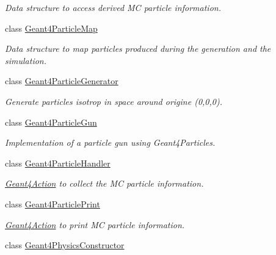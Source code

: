 \begin{DoxyCompactItemize}
\begin{DoxyCompactList}\small\item\em Data structure to access derived MC particle information. \item\end{DoxyCompactList}\item 
class \hyperlink{class_d_d4hep_1_1_simulation_1_1_geant4_particle_map}{Geant4ParticleMap}
\begin{DoxyCompactList}\small\item\em Data structure to map particles produced during the generation and the simulation. \item\end{DoxyCompactList}\item 
class \hyperlink{class_d_d4hep_1_1_simulation_1_1_geant4_particle_generator}{Geant4ParticleGenerator}
\begin{DoxyCompactList}\small\item\em Generate particles isotrop in space around origine (0,0,0). \item\end{DoxyCompactList}\item 
class \hyperlink{class_d_d4hep_1_1_simulation_1_1_geant4_particle_gun}{Geant4ParticleGun}
\begin{DoxyCompactList}\small\item\em Implementation of a particle gun using Geant4Particles. \item\end{DoxyCompactList}\item 
class \hyperlink{class_d_d4hep_1_1_simulation_1_1_geant4_particle_handler}{Geant4ParticleHandler}
\begin{DoxyCompactList}\small\item\em \hyperlink{class_d_d4hep_1_1_simulation_1_1_geant4_action}{Geant4Action} to collect the MC particle information. \item\end{DoxyCompactList}\item 
class \hyperlink{class_d_d4hep_1_1_simulation_1_1_geant4_particle_print}{Geant4ParticlePrint}
\begin{DoxyCompactList}\small\item\em \hyperlink{class_d_d4hep_1_1_simulation_1_1_geant4_action}{Geant4Action} to print MC particle information. \item\end{DoxyCompactList}\item 
class \hyperlink{class_d_d4hep_1_1_simulation_1_1_geant4_physics_constructor}{Geant4PhysicsConstructor}

\end{DoxyCompactItemize}
